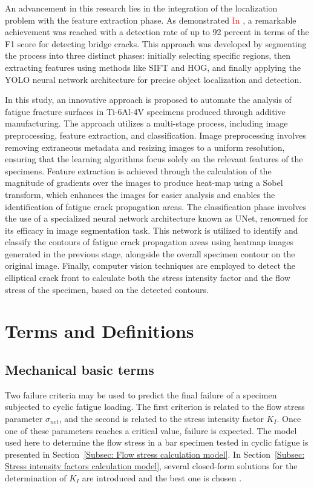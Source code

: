\documentclass[preprint,12pt]{elsarticle}
\begin{document}
    An advancement in this research lies in the integration of the localization problem with the feature extraction phase.
    As demonstrated \textcolor{red}{In \cite{zhang2023automated}}, a remarkable achievement was reached with a detection rate of up to 92 percent in terms of the F1 score for detecting bridge cracks.
    This approach was developed by segmenting the process into three distinct phases: initially selecting specific regions, then extracting features using methods like SIFT and HOG, and finally applying the YOLO neural network architecture for precise object localization and detection.


In this study, an innovative approach is proposed to automate the analysis of fatigue fracture surfaces in Ti-6Al-4V specimens produced through additive manufacturing.
The approach utilizes a multi-stage process, including image preprocessing, feature extraction, and classification.
Image preprocessing involves removing extraneous metadata and resizing images to a uniform resolution, ensuring that the learning algorithms focus solely on the relevant features of the specimens.
Feature extraction is achieved through the calculation of the magnitude of gradients over the images to produce heat-map using a Sobel transform, which enhances the images for easier analysis and enables the identification of fatigue crack propagation areas.
The classification phase involves the use of a specialized neural network architecture known as UNet, renowned for its efficacy in image segmentation task.
This network is utilized to identify and classify the contours of fatigue crack propagation areas using heatmap images generated in the previous stage, alongside the overall specimen contour on the original image.
Finally, computer vision techniques are employed to detect the elliptical crack front to calculate both the stress intensity factor and the flow stress of the specimen, based on the detected contours.





\section{Terms and Definitions}

\subsection{Mechanical basic terms}  \label{sec:Basic terms}


Two failure criteria may be used to predict the final failure of a specimen subjected to cyclic fatigue loading. The first criterion is related to the flow stress parameter \(\sigma_{net}\), and the second is related to the stress intensity factor \(K_{I}\). Once one of these parameters reaches a critical value, failure is expected. The model used here to determine the flow stress in a bar specimen tested in cyclic fatigue is presented in Section~\ref{Subsec: Flow stress calculation model}.
In Section~\ref{Subsec: Stress intensity factors calculation model}, several closed-form solutions for the determination of \(K_I\) are introduced and the best one is chosen \cite{shin2004experimental}.
\end{document}

